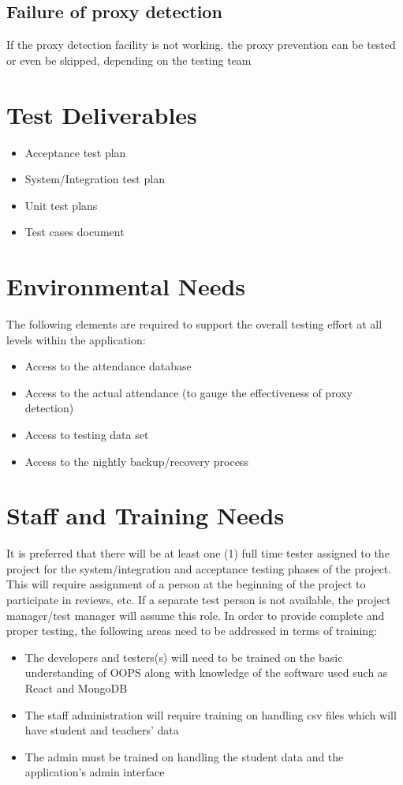 \documentclass{scrreprt}
\begin{document}
\section{Failure of proxy detection}
If the proxy detection facility is not working, the proxy prevention can be tested or even be skipped, depending on the testing team

\chapter{Test Deliverables}
\begin{itemize}
    \item Acceptance test plan
    \item System/Integration test plan
    \item Unit test plans
    \item Test cases document
\end{itemize}

\chapter{Environmental Needs}
The following elements are required to support the overall testing effort at all levels within the application:
\begin{itemize}
    \item Access to the attendance database
    \item Access to the actual attendance (to gauge the effectiveness of proxy detection)
    \item Access to testing data set 
    \item Access to the nightly backup/recovery process
\end{itemize}

\chapter{Staff and Training Needs}
It is preferred that there will be at least one (1) full time tester assigned to the project for the system/integration and acceptance testing phases of the project. This will require assignment of a person at the beginning of the project to participate in reviews, etc. If a separate test person is not available, the project manager/test manager will assume this role.
In order to provide complete and proper testing, the following areas need to be addressed in terms of training:
\begin{itemize}
    \item The developers and testers(s) will need to be trained on the basic understanding of OOPS along with knowledge of the software used such as React and MongoDB
    \item The staff administration will require training on handling csv files which will have student and teachers’ data
    \item The admin must be trained on handling the student data and the application’s admin interface
\end{itemize}
\end{document}
